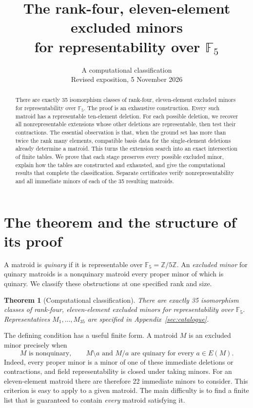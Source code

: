 \documentclass[11pt,a4paper]{article}
\title{The rank-four, eleven-element excluded minors\protect\\
for representability over $\mathbb F_5$}
\author{}
\date{A computational classification\\Revised exposition, 5 November 2026}
\newtheorem{theorem}{Theorem}[section]
\theoremstyle{definition}
\newcommand{\F}{\mathbb F_5}
\begin{document}
\maketitle

\begin{abstract}
There are exactly 35 isomorphism classes of rank-four, eleven-element
excluded minors for representability over $\mathbb F_5$. The proof is an
exhaustive construction. Every such matroid has a representable
ten-element deletion. For each possible deletion, we recover all
nonrepresentable extensions whose other deletions are representable,
then test their contractions. The essential observation is that, when
the ground set has more than twice the rank many elements, compatible
basis data for the single-element deletions already determine a
matroid. This turns the extension search into an exact intersection of
finite tables. We prove that each stage preserves every possible
excluded minor, explain how the tables are constructed and exhausted,
and give the computational results that complete the classification.
Separate certificates verify nonrepresentability and all immediate
minors of each of the 35 resulting matroids.
\end{abstract}

\tableofcontents
\clearpage

\section{The theorem and the structure of its proof}\label{sec:classification}

A matroid is \emph{quinary} if it is representable over
$\F=\mathbb Z/5\mathbb Z$. An \emph{excluded minor} for quinary matroids
is a nonquinary matroid every proper minor of which is quinary. We
classify these obstructions at one specified rank and size.

\begin{theorem}[Computational classification]\label{thm:main}
There are exactly 35 isomorphism classes of rank-four, eleven-element
excluded minors for representability over $\F$. Representatives
$M_1,\ldots,M_{35}$ are specified in Appendix~\ref{sec:catalogue}.
\end{theorem}

The defining condition has a useful finite form. A matroid $M$ is an
excluded minor precisely when
\[
 M\text{ is nonquinary},\qquad
 M\setminus a\text{ and }M/a\text{ are quinary for every }a\in E(M).
\]
Indeed, every proper minor is a minor of one of these immediate
deletions or contractions, and field representability is closed under
taking minors. For an eleven-element matroid there are therefore 22
immediate minors to consider. This criterion is easy to apply to a
given matroid. The main difficulty is to find a finite list that is
guaranteed to contain \emph{every} matroid satisfying it.
\end{document}
